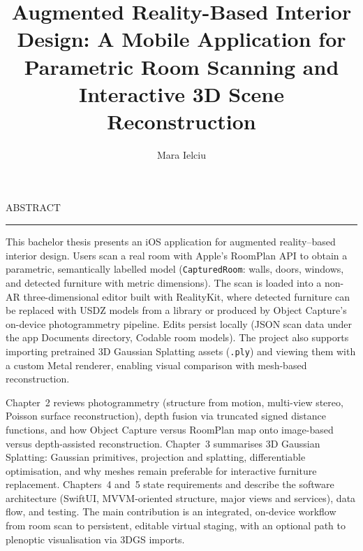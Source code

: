 \documentclass[12pt]{report}
\begin{document}
\title{Augmented Reality-Based Interior Design: A Mobile Application for Parametric Room Scanning and Interactive 3D Scene Reconstruction}					   
\author{Mara Ielciu}											
				
\maketitle


\newpage
\thispagestyle{empty}
\mbox{}
\newpage
{} 

\cleardoublepage
ABSTRACT
\vspace{0.5cm}	
\hrule
\vspace{0.5cm}	

This bachelor thesis presents an iOS application for augmented reality--based interior design. Users scan a real room with Apple's RoomPlan API to obtain a parametric, semantically labelled model (\texttt{CapturedRoom}: walls, doors, windows, and detected furniture with metric dimensions). The scan is loaded into a non-AR three-dimensional editor built with RealityKit, where detected furniture can be replaced with USDZ models from a library or produced by Object Capture's on-device photogrammetry pipeline. Edits persist locally (JSON scan data under the app Documents directory, Codable room models). The project also supports importing pretrained 3D Gaussian Splatting assets (\texttt{.ply}) and viewing them with a custom Metal renderer, enabling visual comparison with mesh-based reconstruction.

Chapter~2 reviews photogrammetry (structure from motion, multi-view stereo, Poisson surface reconstruction), depth fusion via truncated signed distance functions, and how Object Capture versus RoomPlan map onto image-based versus depth-assisted reconstruction. Chapter~3 summarises 3D Gaussian Splatting: Gaussian primitives, projection and splatting, differentiable optimisation, and why meshes remain preferable for interactive furniture replacement. Chapters~4 and~5 state requirements and describe the software architecture (SwiftUI, MVVM-oriented structure, major views and services), data flow, and testing. The main contribution is an integrated, on-device workflow from room scan to persistent, editable virtual staging, with an optional path to plenoptic visualisation via 3DGS imports.



\tableofcontents
\end{document}
